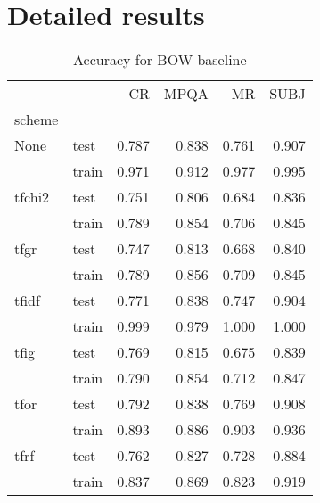 \chapter{Detailed results}
\label{appendix:detailed}

\begin{table}[h]
\begin{center}

\begin{tabular}{llrrrr}
\toprule
{} &      &  CR &  MPQA &  MR &  SUBJ \\
scheme &  &            &              &            &              \\
\midrule
None & test &      0.787 &        0.838 &      0.761 &        0.907 \\
{} & train &      0.971 &        0.912 &      0.977 &        0.995 \\
tfchi2 & test &      0.751 &        0.806 &      0.684 &        0.836 \\
{} & train &      0.789 &        0.854 &      0.706 &        0.845 \\
tfgr & test &      0.747 &        0.813 &      0.668 &        0.840 \\
{} & train &      0.789 &        0.856 &      0.709 &        0.845 \\
tfidf & test &      0.771 &        0.838 &      0.747 &        0.904 \\
{} & train &      0.999 &        0.979 &      1.000 &        1.000 \\
tfig & test &      0.769 &        0.815 &      0.675 &        0.839 \\
{} & train &      0.790 &        0.854 &      0.712 &        0.847 \\
tfor & test &      0.792 &        0.838 &      0.769 &        0.908 \\
{} & train &      0.893 &        0.886 &      0.903 &        0.936 \\
tfrf & test &      0.762 &        0.827 &      0.728 &        0.884 \\
{} & train &      0.837 &        0.869 &      0.823 &        0.919 \\
\bottomrule
\end{tabular}

\caption[Accuracy for BOW baseline]{Accuracy for BOW baseline}
\label{results:bow:abs}
\end{center}
\end{table}


